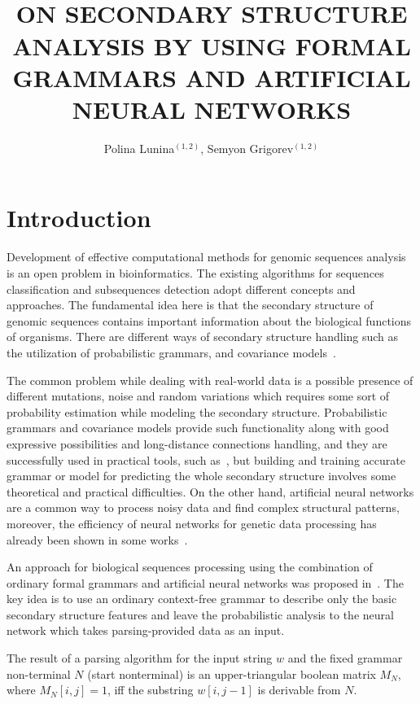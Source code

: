 \documentclass[12pt,a4paper]{cibb}
\title{\large $\ $\\ \bf ON SECONDARY STRUCTURE ANALYSIS BY USING FORMAL GRAMMARS AND ARTIFICIAL NEURAL NETWORKS}
\author{ Polina Lunina$^{(1,2)}$, Semyon Grigorev$^{(1,2)}$}
\begin{document}
\thispagestyle{myheadings}
\pagestyle{myheadings}



\section{\bf Introduction}

Development of effective computational methods for genomic sequences analysis is an open problem in bioinformatics.
The existing algorithms for sequences classification and subsequences detection adopt different concepts and approaches.
The fundamental idea here is that the secondary structure of genomic sequences contains important information about the biological functions of organisms.
There are different ways of secondary structure handling such as the utilization of probabilistic grammars, and covariance models~\cite{EddyDurbin, dowell2004evaluation, knudsen1999rna}.

The common problem while dealing with real-world data is a possible presence of different mutations, noise and random variations which requires some sort of probability estimation while modeling the secondary structure.
Probabilistic grammars and covariance models provide such functionality along with good expressive possibilities and long-distance connections handling, and they are successfully used in practical tools, such as~\cite{Infernal}, but building and training accurate grammar or model for predicting the whole secondary structure involves some theoretical and practical difficulties.
On the other hand, artificial neural networks are a common way to process noisy data and find complex structural patterns, moreover, the efficiency of neural networks for genetic data processing has already been shown in some works~\cite{Humidor,ANN}.

An approach for biological sequences processing using the combination of ordinary formal grammars and artificial neural networks was proposed in~\cite{grigorevcomposition}.
The key idea is to use an ordinary context-free grammar to describe only the basic secondary structure features and leave the probabilistic analysis to the neural network which takes parsing-provided data as an input.

The result of a parsing algorithm for the input string $w$ and the fixed grammar non-terminal $N$ (start nonterminal) is an upper-triangular boolean matrix $M_N$, where $M_N [i,j] = 1$, iff the substring $w[i,j-1]$ is derivable from $N$.
\end{document}
